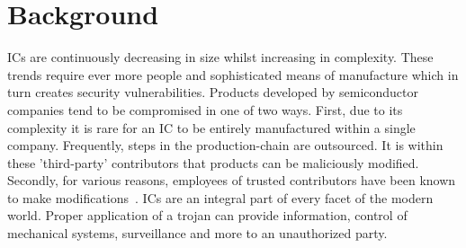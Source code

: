 \label{chapter:hardwareTrojans}

\newlength{\savedunitlength}
\setlength{\unitlength}{2em}
\section{Background} \label{sec:trojanBackGround}
\acrfull{ICs} are continuously decreasing in size whilst increasing in complexity.
These trends require ever more people and sophisticated means of manufacture which in turn creates security vulnerabilities.
Products developed by semiconductor companies tend to be compromised in one of two ways.
First, due to its complexity it is rare for an \acrshort{IC} to be entirely manufactured within a single company.
Frequently, steps in the production-chain are outsourced.
It is within these 'third-party' contributors that products can be maliciously modified.
Secondly, for various reasons, employees of trusted contributors have been known to make modifications~\cite{trojanSurvey2014}.
\acrshort{IC}s are an integral part of every facet of the modern world.
Proper application of a trojan can provide information, control of mechanical systems, surveillance and more to an unauthorized party.



